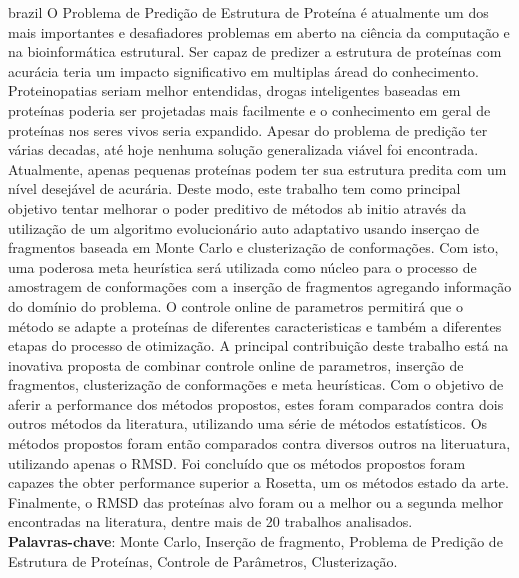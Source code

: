
\begin{resumo}[Resumo]
  \begin{otherlanguage*}{brazil}
    O Problema de Predição de Estrutura de Proteína é atualmente um dos mais
    importantes e desafiadores problemas em aberto na ciência da computação e
    na bioinformática estrutural. Ser capaz de predizer a estrutura de proteínas
    com acurácia teria um impacto significativo em multiplas áread do
    conhecimento. Proteinopatias seriam melhor entendidas, drogas inteligentes
    baseadas em proteínas poderia ser projetadas mais facilmente e o
    conhecimento em geral de proteínas nos seres vivos seria expandido.
    Apesar do problema de predição ter várias decadas, até hoje nenhuma solução
    generalizada viável foi encontrada. Atualmente, apenas pequenas proteínas
    podem ter sua estrutura predita com um nível desejável de acurária. Deste
    modo, este trabalho tem como principal objetivo tentar melhorar o poder
    preditivo de métodos ab initio através da utilização de um algoritmo
    evolucionário auto adaptativo usando inserçao de fragmentos baseada em
    Monte Carlo e clusterização de conformações. Com isto, uma poderosa meta
    heurística será utilizada como núcleo para o processo de amostragem de
    conformações com a inserção de fragmentos agregando informação do domínio do
    problema. O controle online de parametros permitirá que o método se adapte a
    proteínas de diferentes caracteristicas e também a diferentes etapas do
    processo de otimização. A principal contribuição deste trabalho está na
    inovativa proposta de combinar controle online de parametros, inserção de
    fragmentos, clusterização de conformações e meta heurísticas. Com o objetivo
    de aferir a performance dos métodos propostos, estes foram comparados contra
    dois outros métodos da literatura, utilizando uma série de métodos
    estatísticos. Os métodos propostos foram então comparados contra diversos
    outros na literuatura, utilizando apenas o RMSD. Foi concluído que os
    métodos propostos foram capazes the obter performance superior a Rosetta, um
    os métodos estado da arte. Finalmente, o RMSD das proteínas alvo foram ou
    a melhor ou a segunda melhor encontradas na literatura, dentre mais de 20
    trabalhos analisados.
    \\
    \vspace{\onelineskip}
    \noindent
    \textbf{Palavras-chave}: Monte Carlo, Inserção de fragmento, Problema de Predição de Estrutura de Proteínas, Controle de Parâmetros, Clusterização.
  \end{otherlanguage*}
\end{resumo}


\listoffigures*
\cleardoublepage


\listoftables*
\cleardoublepage
